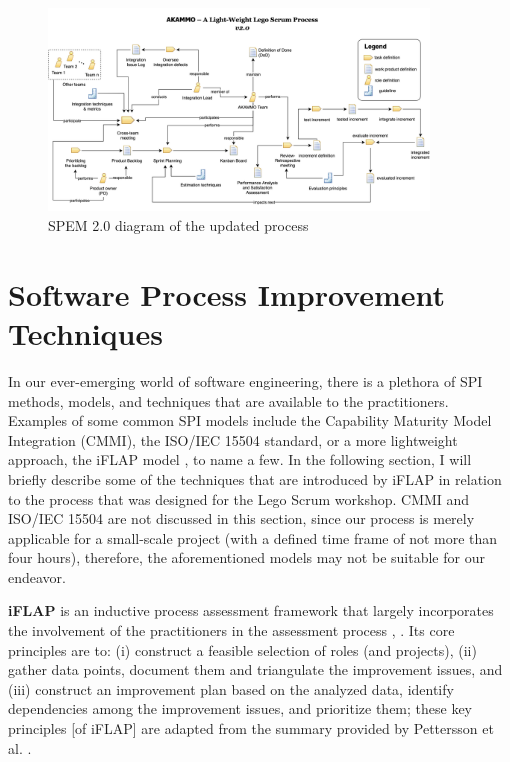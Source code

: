 \documentclass[conference]{IEEEtran}
\begin{document}
\begin{figure}
	\centering
	\includegraphics[width=0.9\textwidth]{process-diagram.png}
  \caption{SPEM 2.0 diagram of the updated process}
	\label{fig:process-diagram}
\end{figure}

\section{Software Process Improvement Techniques}
\label{sec:spi-techniques}


In our ever-emerging world of software engineering, there is a plethora of SPI
methods, models, and techniques that are available to the practitioners.
Examples of some common SPI models include the Capability Maturity Model
Integration (CMMI), the ISO/IEC 15504 standard, or a more lightweight approach,
the iFLAP model \cite{Pettersson2008}, to name a few. In the following
section, I will briefly describe some of the techniques that are introduced by
iFLAP in relation to the process that was designed for the Lego Scrum workshop.
CMMI and ISO/IEC 15504 are not discussed in this section, since our process is
merely applicable for a small-scale project (with a defined time frame of not
more than four hours), therefore, the aforementioned models may not be suitable
for our endeavor.

\textbf{{\selectfont iFLAP}} is an inductive process assessment
framework that largely incorporates the involvement of the practitioners in the
assessment process \cite{Pettersson2008}, \cite{Malvius2009}. Its core
principles are to: (i) construct a feasible selection of roles (and projects),
(ii) gather data points, document them and triangulate the improvement issues,
and (iii) construct an improvement plan based on the analyzed data, identify
dependencies among the improvement issues, and prioritize them; these key
principles [of iFLAP] are adapted from the summary provided by Pettersson et
al. \cite{Pettersson2008}.
\end{document}
